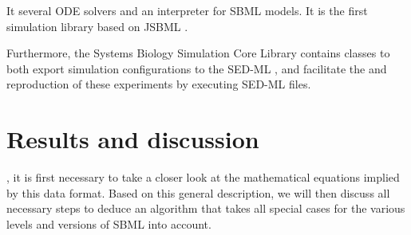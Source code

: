 \documentclass[10pt]{bmc_article}
\newenvironment{bmcformat}{\begin{raggedright}\baselineskip20pt\sloppy\setboolean{publ}{false}}{\end{raggedright}\baselineskip20pt\sloppy}
\begin{document}
\begin{bmcformat}
%
%
%
%
It  several \acf{ODE} solvers and an interpreter for \acs{SBML}
models.
It is the first simulation library based on JSBML \cite{Draeger2011b}. 
%

Furthermore, the Systems Biology Simulation Core Library contains classes to both export
simulation configurations to the \acf{SED-ML} \cite{Waltemath2011},
and facilitate the  and reproduction of these experiments by executing \acs{SED-ML} files.

\section*{Results and discussion}

,
it is first necessary to take a closer look at the mathematical equations implied by this data format.
Based on this general description, we will then discuss all necessary steps
to deduce an algorithm that takes all special cases for the various levels and
versions of \acs{SBML} into account.


\end{bmcformat}
\end{document}
